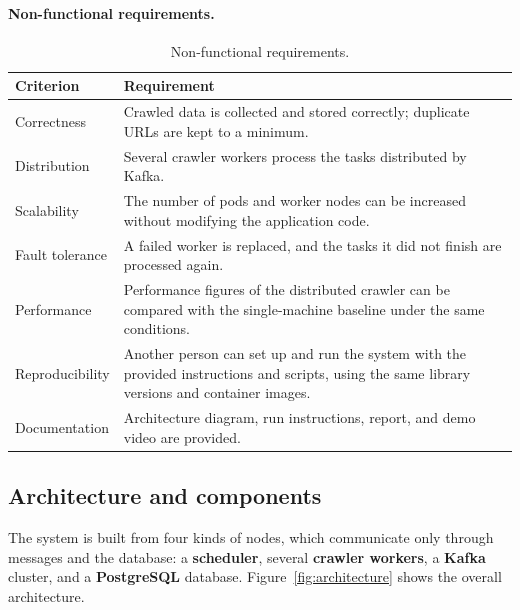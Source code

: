 \paragraph{Non-functional requirements.}
\begin{table}[H]
\centering
\begin{tabular}{|p{3.2cm}|p{10.2cm}|}
\hline
\textbf{Criterion} & \textbf{Requirement} \\
\hline
Correctness & Crawled data is collected and stored correctly; duplicate URLs are kept to a minimum. \\
\hline
Distribution & Several crawler workers process the tasks distributed by Kafka. \\
\hline
Scalability & The number of pods and worker nodes can be increased without modifying the application code. \\
\hline
Fault tolerance & A failed worker is replaced, and the tasks it did not finish are processed again. \\
\hline
Performance & Performance figures of the distributed crawler can be compared with the single-machine baseline under the same conditions. \\
\hline
Reproducibility & Another person can set up and run the system with the provided instructions and scripts, using the same library versions and container images. \\
\hline
Documentation & Architecture diagram, run instructions, report, and demo video are provided. \\
\hline
\end{tabular}
\caption{Non-functional requirements.}
\end{table}




\subsection{Architecture and components}
The system is built from four kinds of nodes, which communicate only through messages and the database: a \textbf{scheduler}, several \textbf{crawler workers}, a \textbf{Kafka} cluster, and a \textbf{PostgreSQL} database. Figure~\ref{fig:architecture} shows the overall architecture.

